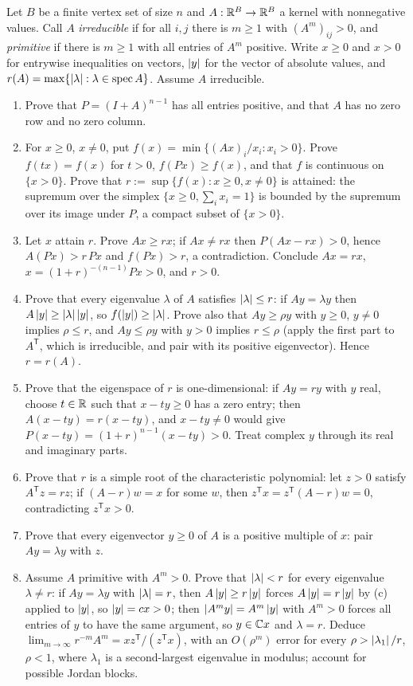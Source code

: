 \begin{exercise}
Let $B$ be a finite vertex set of size $n$ and $A:\mathbb R^B\to\mathbb R^B$ a kernel with nonnegative values. Call $A$ \emph{irreducible} if for all $i,j$ there is $m\ge1$ with $(A^m)_{ij}>0$, and \emph{primitive} if there is $m\ge1$ with all entries of $A^m$ positive. Write $x\ge0$ and $x>0$ for entrywise inequalities on vectors, $\left\lvert y\right\rvert$ for the vector of absolute values, and $r(A)=\max\{\left\lvert \lambda\right\rvert:\lambda\in\operatorname{spec} A\}$. Assume $A$ irreducible.
\begin{enumerate}[label=(\alph*)]
\item Prove that $P=(I+A)^{n-1}$ has all entries positive, and that $A$ has no zero row and no zero column.
\item For $x\ge0$, $x\ne0$, put $f(x)=\min\{(Ax)_i/x_i:x_i>0\}$. Prove $f(tx)=f(x)$ for $t>0$, $f(Px)\ge f(x)$, and that $f$ is continuous on $\{x>0\}$. Prove that $r:=\sup\{f(x):x\ge0,x\ne0\}$ is attained: the supremum over the simplex $\{x\ge0,\sum_ix_i=1\}$ is bounded by the supremum over its image under $P$, a compact subset of $\{x>0\}$.
\item Let $x$ attain $r$. Prove $Ax\ge rx$; if $Ax\ne rx$ then $P(Ax-rx)>0$, hence $A(Px)>r\,Px$ and $f(Px)>r$, a contradiction. Conclude $Ax=rx$, $x=(1+r)^{-(n-1)}Px>0$, and $r>0$.
\item Prove that every eigenvalue $\lambda$ of $A$ satisfies $\left\lvert \lambda\right\rvert\le r$: if $Ay=\lambda y$ then $A\left\lvert y\right\rvert\ge\left\lvert \lambda\right\rvert\left\lvert y\right\rvert$, so $f(\left\lvert y\right\rvert)\ge\left\lvert \lambda\right\rvert$. Prove also that $Ay\ge\rho y$ with $y\ge0$, $y\ne0$ implies $\rho\le r$, and $Ay\le\rho y$ with $y>0$ implies $r\le\rho$ (apply the first part to $A^{\mathsf T}$, which is irreducible, and pair with its positive eigenvector). Hence $r=r(A)$.
\item Prove that the eigenspace of $r$ is one-dimensional: if $Ay=ry$ with $y$ real, choose $t\in\mathbb R$ such that $x-ty\ge0$ has a zero entry; then $A(x-ty)=r(x-ty)$, and $x-ty\ne0$ would give $P(x-ty)=(1+r)^{n-1}(x-ty)>0$. Treat complex $y$ through its real and imaginary parts.
\item Prove that $r$ is a simple root of the characteristic polynomial: let $z>0$ satisfy $A^{\mathsf T}z=rz$; if $(A-r)w=x$ for some $w$, then $z^{\mathsf T}x=z^{\mathsf T}(A-r)w=0$, contradicting $z^{\mathsf T}x>0$.
\item Prove that every eigenvector $y\ge0$ of $A$ is a positive multiple of $x$: pair $Ay=\lambda y$ with $z$.
\item Assume $A$ primitive with $A^m>0$. Prove that $\left\lvert \lambda\right\rvert<r$ for every eigenvalue $\lambda\ne r$: if $Ay=\lambda y$ with $\left\lvert \lambda\right\rvert=r$, then $A\left\lvert y\right\rvert\ge r\left\lvert y\right\rvert$ forces $A\left\lvert y\right\rvert=r\left\lvert y\right\rvert$ by (c) applied to $\left\lvert y\right\rvert$, so $\left\lvert y\right\rvert=cx>0$; then $\left\lvert A^my\right\rvert=A^m\left\lvert y\right\rvert$ with $A^m>0$ forces all entries of $y$ to have the same argument, so $y\in\mathbb C x$ and $\lambda=r$. Deduce $\lim_{m\to\infty}r^{-m}A^m=xz^{\mathsf T}/(z^{\mathsf T}x)$, with an $O(\rho^m)$ error for every $\rho>\left\lvert \lambda_1\right\rvert/r$, $\rho<1$, where $\lambda_1$ is a second-largest eigenvalue in modulus; account for possible Jordan blocks.

\end{enumerate}
\end{exercise}
